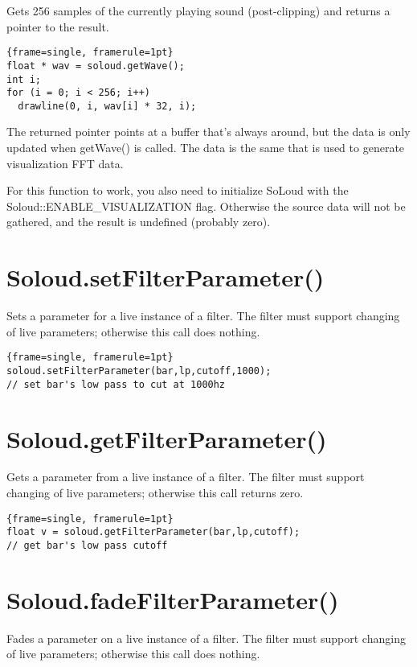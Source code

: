 Gets 256 samples of the currently playing sound (post-clipping) and returns a pointer to the result.

\begin{lstlisting}{frame=single, framerule=1pt}
float * wav = soloud.getWave();
int i;
for (i = 0; i < 256; i++)
  drawline(0, i, wav[i] * 32, i);
\end{lstlisting}

The returned pointer points at a buffer that's always around, but the data is only updated when getWave() is called. The data is the same that is used to generate visualization FFT data.

For this function to work, you also need to initialize SoLoud with the Soloud::ENABLE\_VISUALIZATION flag. Otherwise the source data will not be gathered, and the result is undefined (probably zero).

\section{Soloud.setFilterParameter()}

Sets a parameter for a live instance of a filter. The filter must support changing of live parameters; otherwise this call does nothing.

\begin{lstlisting}{frame=single, framerule=1pt}
soloud.setFilterParameter(bar,lp,cutoff,1000); 
// set bar's low pass to cut at 1000hz
\end{lstlisting}

\section{Soloud.getFilterParameter()}
Gets a parameter from a live instance of a filter. The filter must support changing of live parameters; otherwise this call returns zero.
\begin{lstlisting}{frame=single, framerule=1pt}
float v = soloud.getFilterParameter(bar,lp,cutoff); 
// get bar's low pass cutoff
\end{lstlisting}

\section{Soloud.fadeFilterParameter()}

Fades a parameter on a live instance of a filter. The filter must support changing of live parameters; otherwise this call does nothing.

